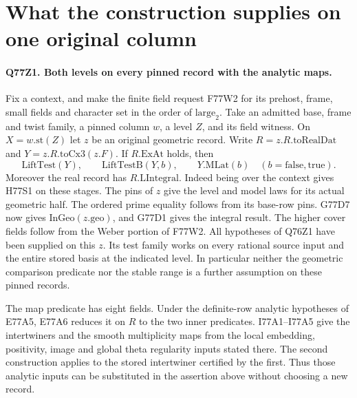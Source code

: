 \section{What the construction supplies on one original column}

\paragraph{Q77Z1. Both levels on every pinned record with the analytic maps.}
Fix a context, and make the finite field request F77W2 for its
prehost, frame, small fields and character set in the order of
$\mathrm{large}_2$. Take an admitted base, frame and twist family,
a pinned column $w$, a level $Z$, and its field witness. On
$X=w.\mathrm{st}(Z)$ let $z$ be an original geometric record.
Write $R=z.R.\mathrm{toRealDat}$ and $Y=z.R.\mathrm{toCx3}(z.F)$.
If $R.\mathrm{ExAt}$ holds, then
\[
  \mathrm{LiftTest}(Y),\qquad
  \mathrm{LiftTestB}(Y,b),\qquad Y.\mathrm{MLat}(b)
                  \quad (b=\mathrm{false},\mathrm{true}).
\]
Moreover the real record has $R.\mathrm{LIntegral}$.
Indeed being over the context gives H77S1 on these stages.
The pins of $z$ give the level and model laws for its actual
geometric half. The ordered prime equality follows from its
base-row pins. G77D7 now gives $\mathrm{InGeo}(z.\mathrm{geo})$,
and G77D1 gives the integral result. The higher cover fields
follow from the Weber portion of F77W2. All hypotheses of Q76Z1
have been supplied on this $z$. Its test family works on every
rational source input and the entire stored basis at the indicated
level. In particular neither the geometric comparison predicate nor
the stable range is a further assumption on these pinned records.

The map predicate has eight fields. Under the definite-row analytic
hypotheses of E77A5, E77A6 reduces it on $R$ to the two inner
predicates. I77A1--I77A5 give the intertwiners and the smooth
multiplicity maps from the local embedding, positivity, image
and global theta regularity inputs stated there. The second
construction applies to the stored intertwiner certified by the
first. Thus those analytic inputs can be substituted in the
assertion above without choosing a new record.

